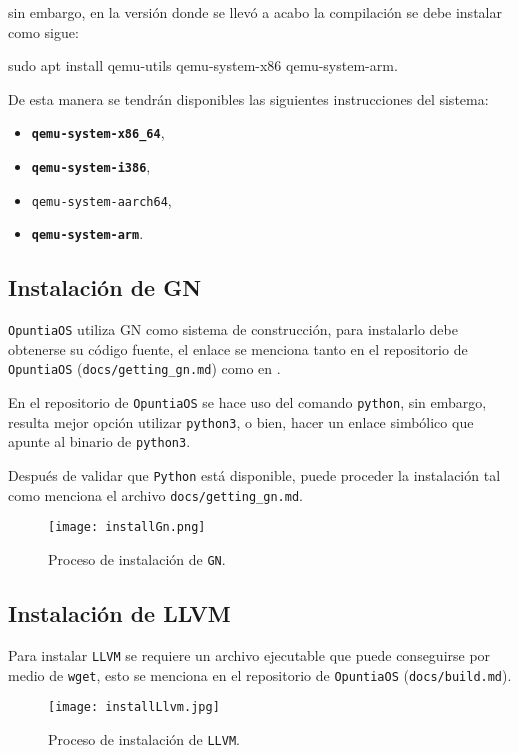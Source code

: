 	
	
	sin embargo, en la versión donde se llevó a acabo la compilación se debe 
	instalar como sigue:
	\begin{center}
		\ttfamily
		sudo apt install qemu-utils qemu-system-x86 qemu-system-arm.
	\end{center}

	
	De esta manera se tendrán disponibles las siguientes instrucciones 
	del sistema:
	\begin{itemize} \setlength\itemsep{0pt}
		\item \textbf{\texttt{qemu-system-x86\_64}},
		\item \textbf{\texttt{qemu-system-i386}},
		\item \texttt{qemu-system-aarch64},
		\item \textbf{\texttt{qemu-system-arm}}.
	\end{itemize}



\subsection{Instalación de GN \label{ssec:installGn}}
	\texttt{OpuntiaOS} utiliza GN como sistema de construcción, para instalarlo debe obtenerse su código fuente, el enlace se menciona tanto en el repositorio de
	\texttt{OpuntiaOS} (\texttt{docs/getting\_gn.md}) como en \cite{gn}.
	
	
	
	En el repositorio de \texttt{OpuntiaOS} se hace uso del comando \texttt{python}, sin embargo, resulta mejor opción utilizar \texttt{python3}, o bien, hacer un enlace simbólico que apunte al binario de \texttt{python3}.
	
	
	
	Después de validar que \texttt{Python} está disponible, puede proceder la 
	instalación tal como menciona el archivo \texttt{docs/getting\_gn.md}.
	\begin{figure}[ht]
		\centering
		\texttt{[image: installGn.png]}
		\caption{
			Proceso de instalación de \texttt{GN}.
			\label{fig:installGn}
		}
	\end{figure}




\newpage
\subsection{Instalación de LLVM}
	Para instalar \texttt{LLVM} se requiere un archivo ejecutable que puede 
	conseguirse por medio de \texttt{wget}, esto se menciona en el repositorio de \texttt{OpuntiaOS} (\texttt{docs/build.md}).
	\begin{figure}[ht]
		\centering
		\texttt{[image: installLlvm.jpg]}
		\caption{
			Proceso de instalación de \texttt{LLVM}.
			\label{fig:installLlvm}
		}
	\end{figure}


